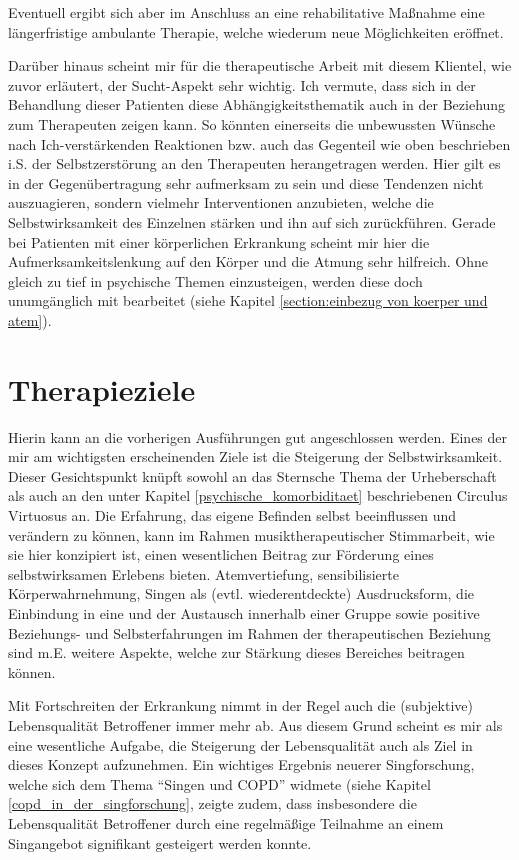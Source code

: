 Eventuell ergibt sich aber im Anschluss an eine rehabilitative Maßnahme eine längerfristige ambulante Therapie, welche wiederum neue Möglichkeiten eröffnet. 

Darüber hinaus scheint mir für die therapeutische Arbeit mit diesem Klientel, wie zuvor erläutert, der Sucht-Aspekt sehr wichtig. Ich vermute, dass sich in der Behandlung dieser Patienten diese Abhängigkeitsthematik auch in der Beziehung zum Therapeuten zeigen kann. So könnten einerseits die unbewussten Wünsche nach Ich-verstärkenden Reaktionen bzw. auch das Gegenteil wie oben beschrieben i.S. der Selbstzerstörung an den Therapeuten herangetragen werden. Hier gilt es in der Gegenübertragung sehr aufmerksam zu sein und diese Tendenzen nicht auszuagieren, sondern vielmehr Interventionen anzubieten, welche die Selbstwirksamkeit des Einzelnen stärken und ihn auf sich zurückführen. Gerade bei Patienten mit einer körperlichen Erkrankung scheint mir hier die Aufmerksamkeitslenkung auf den Körper und die Atmung sehr hilfreich. Ohne gleich zu tief in psychische Themen einzusteigen, werden diese doch unumgänglich mit bearbeitet (siehe Kapitel \ref{section:einbezug von koerper und atem}). 

\section{Therapieziele}
Hierin kann an die vorherigen Ausführungen gut angeschlossen werden. Eines der mir am wichtigsten erscheinenden Ziele ist die Steigerung der Selbstwirksamkeit. Dieser Gesichtspunkt knüpft sowohl an das Sternsche Thema der Urheberschaft als auch an den unter Kapitel \ref{psychische_komorbiditaet} beschriebenen Circulus Virtuosus an. Die Erfahrung, das eigene Befinden selbst beeinflussen und verändern zu können, kann im Rahmen musiktherapeutischer Stimmarbeit, wie sie hier konzipiert ist, einen wesentlichen Beitrag zur Förderung eines selbstwirksamen Erlebens bieten. Atemvertiefung, sensibilisierte Körperwahrnehmung, Singen als (evtl. wiederentdeckte) Ausdrucksform, die Einbindung in eine und der Austausch innerhalb einer Gruppe sowie positive Beziehungs- und Selbsterfahrungen im Rahmen der therapeutischen Beziehung sind m.E. weitere Aspekte, welche zur Stärkung dieses Bereiches beitragen können. %

Mit Fortschreiten der Erkrankung nimmt in der Regel auch die (subjektive) Lebensqualität Betroffener immer mehr ab. Aus diesem Grund scheint es mir als eine wesentliche Aufgabe, die Steigerung der Lebensqualität auch als Ziel in dieses Konzept aufzunehmen. Ein wichtiges Ergebnis neuerer Singforschung, welche sich dem Thema "`Singen und COPD"' widmete (siehe Kapitel  \ref{copd_in_der_singforschung}, zeigte zudem, dass insbesondere die Lebensqualität Betroffener durch eine regelmäßige Teilnahme an einem Singangebot signifikant gesteigert werden konnte. 

